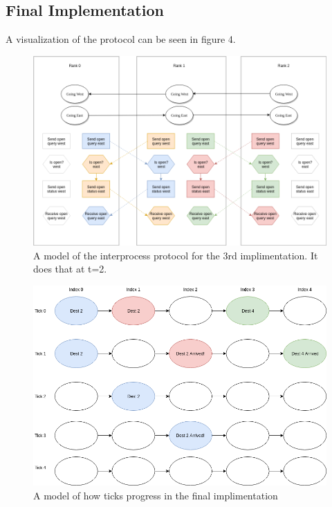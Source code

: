 \documentclass[10pt,a4paper]{article}
\begin{document}
    
    \subsection{Final Implementation}
    A visualization of the protocol can be seen in figure 4.
    
    \begin{figure}
        \centering
        \includegraphics[scale=0.4]{imp3_diag.png}
        \caption{A model of the interprocess protocol for the 3rd implimentation. It does that at t=2.}
        \label{fig:my_label}
    \end{figure}
    
    \begin{figure}
        \centering
        \includegraphics[scale=0.4]{imp3_sim.png}
        \caption{A model of how ticks progress in the final implimentation}
        \label{fig:my_label}
    \end{figure}
    
\end{document}
